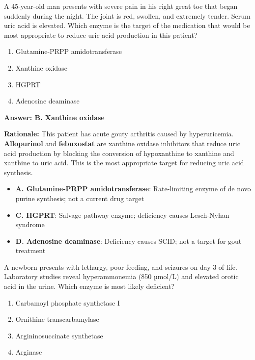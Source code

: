 \begin{exercise}
A 45-year-old man presents with severe pain in his right great toe that began suddenly during the night. The joint is red, swollen, and extremely tender. Serum uric acid is elevated. Which enzyme is the target of the medication
that would be most appropriate to reduce uric acid production in this patient?
\begin{enumerate}[label=\Alph*.]
    \item Glutamine-PRPP amidotransferase
    \item Xanthine oxidase
    \item HGPRT
    \item Adenosine deaminase
\end{enumerate}
\end{exercise}

\begin{solution}
\textbf{Answer: B. Xanthine oxidase}

\textbf{Rationale:} This patient has acute gouty arthritis caused by hyperuricemia. \textbf{Allopurinol} and \textbf{febuxostat} are xanthine oxidase inhibitors that reduce uric acid production by blocking the conversion of hypoxanthine to xanthine and xanthine to uric acid. This is the most appropriate target for reducing uric acid synthesis.

\begin{itemize}
    \item \textbf{A. Glutamine-PRPP amidotransferase}: Rate-limiting enzyme of de novo purine synthesis; not a current drug target
    \item \textbf{C. HGPRT}: Salvage pathway enzyme; deficiency causes Lesch-Nyhan syndrome
    \item \textbf{D. Adenosine deaminase}: Deficiency causes SCID; not a target for gout treatment
\end{itemize}
\end{solution}

\begin{exercise}
A newborn presents with lethargy, poor feeding, and seizures on day 3 of life. Laboratory studies reveal hyperammonemia (850 µmol/L) and elevated orotic acid in the urine. Which enzyme is most likely deficient?
\begin{enumerate}[label=\Alph*.]
    \item Carbamoyl phosphate synthetase I
    \item Ornithine transcarbamylase
    \item Argininosuccinate synthetase
    \item Arginase
\end{enumerate}
\end{exercise}

